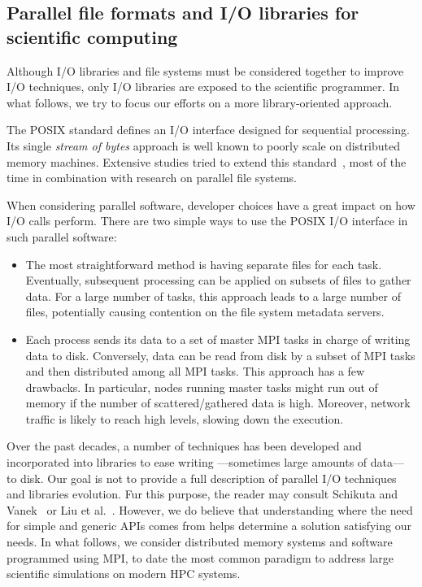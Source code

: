 \subsection{Parallel file formats and I/O libraries for scientific computing}
\label{subsection:ADIOS}

Although I/O libraries and file systems must be considered together to improve
I/O techniques, only I/O libraries are exposed to the scientific programmer. In
what follows, we try to focus our efforts on a more library-oriented approach.

The POSIX standard defines an I/O interface designed for sequential processing.
Its single \emph{stream of bytes} approach is well known to poorly scale on
distributed memory machines. Extensive studies tried to extend this
standard~\cite{Vilayannur2008}, most of the time in combination with research on
parallel file systems.%

When considering parallel software, developer choices have a great impact on how
I/O calls perform. There are two simple ways to use the POSIX I/O interface in
such parallel software:
\begin{itemize}
\item The most straightforward method is having separate files for each task.
Eventually, subsequent processing can be applied on subsets of files to gather data.
For a large number of tasks, this approach leads to a large number of files,
potentially causing contention on the file system metadata servers.
\item Each process sends its data to a set of master MPI tasks in charge of
writing data to disk. Conversely, data can be read from disk by a subset of MPI
tasks and then distributed among all MPI tasks. This approach has a few
drawbacks. In particular, nodes running master tasks might run out of memory if
the number of scattered/gathered data is high. Moreover, network traffic is
likely to reach high levels, slowing down the execution.
\end{itemize}

Over the past decades, a number of techniques has been developed and
incorporated into libraries  to ease writing ---sometimes large amounts of data---
to disk.
Our goal is not to provide a full description of parallel I/O techniques and
libraries evolution. Fur this purpose, the reader may consult Schikuta and
Vanek~\cite{Schikuta2001} or Liu et al.~\cite{Liu2013}. However, we do believe
that understanding where the need for simple and generic APIs comes from helps
determine a solution satisfying our needs. In what follows, we consider
distributed memory systems and software programmed using MPI, to date the most
common paradigm to address large scientific simulations on modern HPC systems.


